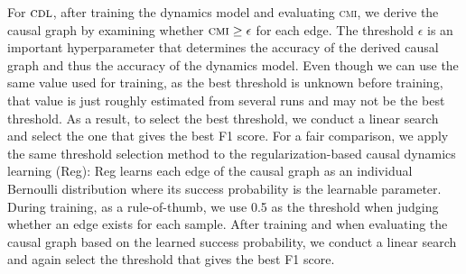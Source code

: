 For $\textsc{cdl}$, after training the dynamics model and evaluating \textsc{cmi}, we derive the causal graph by examining whether $\textsc{cmi} \ge \epsilon$ for each edge. The threshold $\epsilon$ is an important hyperparameter that determines the accuracy of the derived causal graph and thus the accuracy of the dynamics model. Even though we can use the same value used for training, as the best threshold is unknown before training, that value is just roughly estimated from several runs and may not be the best threshold. As a result, to select the best threshold, we conduct a linear search and select the one that gives the best F1 score. For a fair comparison, we apply the same threshold selection method to the regularization-based causal dynamics learning (Reg): Reg learns each edge of the causal graph as an individual Bernoulli distribution where its success probability is the learnable parameter. During training, as a rule-of-thumb, we use 0.5 as the threshold when judging whether an edge exists for each sample. After training and when evaluating the causal graph based on the learned success probability, we conduct a linear search and again select the threshold that gives the best F1 score.

